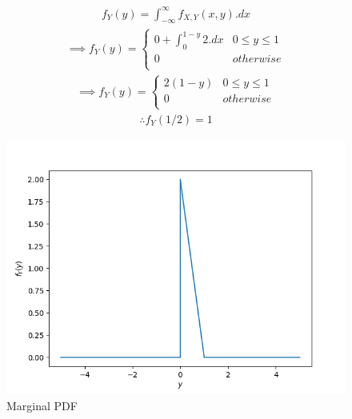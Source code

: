 
\begin{align}
    \tag{23.1}
    f_{Y}(y) = \int_{-\infty}^{\infty}f_{X,Y}(x,y).dx
\end{align}
\begin{align}
    \tag{23.2}
    \implies f_{Y}(y) = \left\{
    \begin{array}{ll}
      0+\int_{0}^{1-y}2.dx & 0\leq y\leq 1 \\
      0 & otherwise \\
    \end{array} 
    \right.
\end{align}
\begin{align}
    \tag{23.3}
    \implies f_{Y}(y) = \left\{
    \begin{array}{ll}
      2(1-y) & 0\leq y\leq 1 \\
      0 & otherwise \\
    \end{array} 
    \right.
\end{align}
\begin{align}
    \tag{23.4}
    \therefore f_{Y}(1/2) = 1
\end{align}
\begin{figure}
\centering
\includegraphics[width=\columnwidth]{solutions/ma/2018/23/Figure/Plot.png}
\caption{Marginal PDF}
\label{fig:ma2018-23:marginal}
\end{figure}


